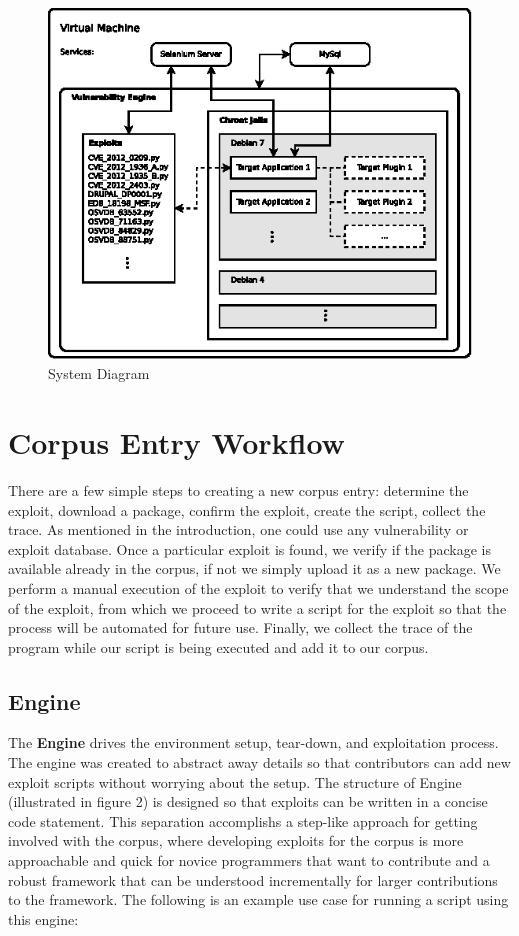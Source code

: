 \documentclass[letterpaper,twocolumn,10pt]{article}
\begin{document}
\begin{figure}[!tp]
\begin{center}
\includegraphics[scale=1.17]{system_diagram.eps}
\end{center}
\caption{System Diagram}
\end{figure}


\section{Corpus Entry Workflow}

There are a few simple steps to creating a new corpus entry: determine the exploit, download a package, confirm the exploit, create the script, collect the trace.  As mentioned in the introduction, one could use any vulnerability or exploit database.   Once a particular exploit is found, we verify if the package is available already in the corpus, if not we simply upload it as a new package.  We perform a manual execution of the exploit to verify that we understand the scope of the exploit, from which we proceed to write a script for the exploit so that the process will be automated for future use.  Finally, we collect the trace of the program while our script is being executed and add it to our corpus.



\subsection{Engine}
The {\bf Engine} drives the environment setup, tear-down, and exploitation process.  The engine was created to abstract away details so that contributors can add new exploit scripts without worrying about the setup. The structure of Engine (illustrated in figure 2) is designed so that exploits can be written in a concise code statement.  This separation accomplishs a step-like approach for getting involved with the corpus, where developing exploits for the corpus is more approachable and quick for novice programmers that want to contribute and a robust framework that can be understood incrementally for larger contributions to the framework.  The following is an  example use case for running a script using this engine:
 
\end{document}
